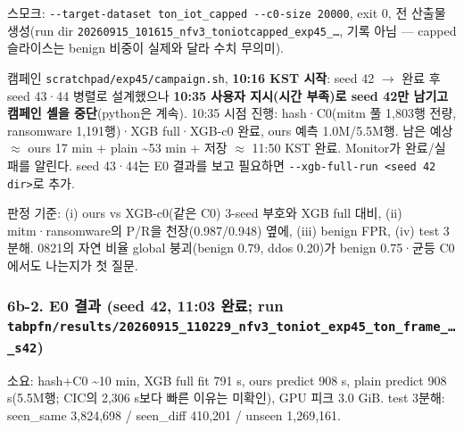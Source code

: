 \par\noindent \textbullet\enspace 스모크: \texttt{-\allowbreak{}-\allowbreak{}target\allowbreak{}-\allowbreak{}dataset\allowbreak{} ton\_\allowbreak{}\allowbreak{}iot\allowbreak{}\_\allowbreak{}\allowbreak{}capped \allowbreak{}-\allowbreak{}-\allowbreak{}c0-\allowbreak{}siz\allowbreak{}e 20000}, exit 0, 전 산출물 생성(run dir \texttt{20260915\allowbreak{}\_\allowbreak{}\allowbreak{}101615\_\allowbreak{}\allowbreak{}nfv3\_\allowbreak{}\allowbreak{}ton\allowbreak{}iotcappe\allowbreak{}d\_\allowbreak{}\allowbreak{}exp45\_\allowbreak{}\allowbreak{}…}, 기록 아님 — capped 슬라이스는 benign 비중이 실제와 달라 수치 무의미).


\par\noindent \textbullet\enspace 캠페인 \texttt{scratchp\allowbreak{}ad/\allowbreak{}\allowbreak{}exp45\allowbreak{}/\allowbreak{}\allowbreak{}campaig\allowbreak{}n.\allowbreak{}sh}, \textbf{10:16 KST 시작}: seed 42  \ensuremath{\rightarrow}  완료 후 seed 43·44 병렬로 설계했으나 \textbf{10:35 사용자 지시(시간 부족)로 seed 42만 남기고 캠페인 셸을 중단}(python은 계속). 10:35 시점 진행: hash·C0(mitm 풀 1,803행 전량, ransomware 1,191행)·XGB full·XGB-c0 완료, ours 예측 1.0M/\allowbreak{}5.5M행. 남은 예상 \ensuremath{\approx} ours 17 min +\allowbreak{} plain \textasciitilde{}53 min +\allowbreak{} 저장 \ensuremath{\approx} 11:50 KST 완료. Monitor가 완료/\allowbreak{}실패를 알린다. seed 43·44는 E0 결과를 보고 필요하면 \texttt{-\allowbreak{}-\allowbreak{}xgb-\allowbreak{}fu\allowbreak{}ll-\allowbreak{}run <\allowbreak{}seed 42 \allowbreak{}dir>}로 추가.


\par\noindent \textbullet\enspace 판정 기준: (i) ours vs XGB-c0(같은 C0) 3-seed 부호와 XGB full 대비, (ii) mitm·ransomware의 P/\allowbreak{}R을 천장(0.987/\allowbreak{}0.948) 옆에, (iii) benign FPR, (iv) test 3분해. 0821의 자연 비율 global 붕괴(benign 0.79, ddos 0.20)가 benign 0.75·균등 C0에서도 나는지가 첫 질문.


\subsubsection{6b-2. E0 결과 (seed 42, 11:03 완료; run \texttt{tabpfn/\allowbreak{}\allowbreak{}r\allowbreak{}esults/\allowbreak{}\allowbreak{}2\allowbreak{}0260915\_\allowbreak{}\allowbreak{}110229\_\allowbreak{}\allowbreak{}n\allowbreak{}fv3\_\allowbreak{}\allowbreak{}toni\allowbreak{}ot\_\allowbreak{}\allowbreak{}exp45\allowbreak{}\_\allowbreak{}\allowbreak{}ton\_\allowbreak{}\allowbreak{}fra\allowbreak{}me\_\allowbreak{}\allowbreak{}…\_\allowbreak{}\allowbreak{}s42\allowbreak{}})}
소요: hash+\allowbreak{}C0 \textasciitilde{}10 min, XGB full fit 791 s, ours predict 908 s, plain predict 908 s(5.5M행; CIC의 2,306 s보다 빠른 이유는 미확인), GPU 피크 3.0 GiB. test 3분해: seen\_\allowbreak{}same 3,824,698 /\allowbreak{} seen\_\allowbreak{}diff 410,201 /\allowbreak{} unseen 1,269,161.

